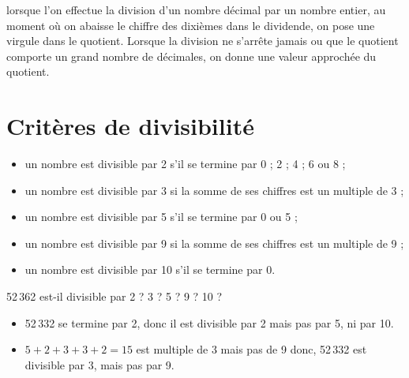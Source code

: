 \begin{remarques}
   lorsque l'on effectue la division d'un nombre décimal par un nombre entier, au moment où on abaisse le chiffre des dixièmes dans le dividende, on pose une virgule dans le quotient. Lorsque la division \og ne s'arrête jamais \fg{} ou que le quotient comporte un grand nombre de décimales, on donne une valeur approchée du quotient.
\end{remarques}


\section{Critères de divisibilité}

\begin{propriete}
   \begin{itemize}
      \item un nombre est divisible par 2 s'il se termine par 0 ; 2 ; 4 ; 6 ou 8 ;
      \item un nombre est divisible par 3 si la somme de ses chiffres est un multiple de 3 ;
      \item un nombre est divisible par 5 s'il se termine par 0 ou 5 ;
      \item un nombre est divisible par 9 si la somme de ses chiffres est un multiple de 9 ;
      \item un nombre est divisible par 10 s'il se termine par 0.
   \end{itemize}
   \vspace*{-3mm}
\end{propriete}

\begin{exemple}
      52\,362 est-il divisible par 2 ? 3 ? 5 ? 9 ? 10 ?
   \correction
      \vspace*{-5mm}
      \begin{itemize}
      \item 52\,332 se termine par 2, donc il est divisible par 2 mais pas par 5, ni par 10.
      \item $5+2+3+3+2=15$ est multiple de 3 mais pas de 9 donc, 52\,332 est divisible par 3, mais pas par 9.
    \end{itemize}
\end{exemple}


\exercicesbase

